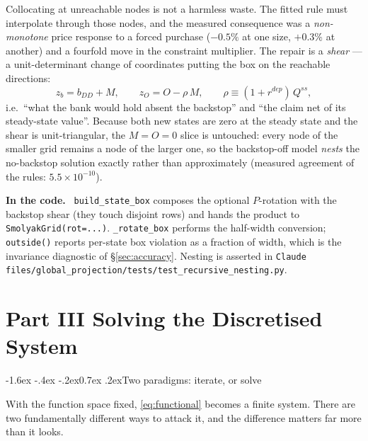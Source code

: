 \documentclass[10pt,a4paper]{article}
\makeatletter
\theoremstyle{definition}
\theoremstyle{plain}
\theoremstyle{remark}
\newenvironment{codehint}%
  {\par\vspace{2pt}\begin{framed}\noindent\small\textcolor{codeblue}{\textbf{In the code.}}\ }%
  {\end{framed}\vspace{2pt}}
\newcommand{\file}[1]{\textcolor{codeblue}{\texttt{#1}}}
\newcommand{\code}[1]{\texttt{#1}}
\renewcommand\section{\@startsection{section}{1}{\z@}%
  {-1.6ex \@plus -.4ex \@minus -.2ex}{0.7ex \@plus.2ex}{\normalfont\large\bfseries}}
\makeatother
\begin{document}
Collocating at unreachable nodes is not a harmless waste. The fitted rule must interpolate
through those nodes, and the measured consequence was a \emph{non-monotone} price response to
a forced purchase ($-0.5\%$ at one size, $+0.3\%$ at another) and a fourfold move in the
constraint multiplier. The repair is a \emph{shear} --- a unit-determinant change of
coordinates putting the box on the reachable directions:
\begin{equation}
  z_{b} = b_{DD} + M, \qquad z_{O} = O - \rho\,M, \qquad \rho \equiv (1+r^{dep})\,Q^{ss},
\end{equation}
i.e.\ ``what the bank would hold absent the backstop'' and ``the claim net of its
steady-state value''. Because both new states are zero at the steady state and the shear is
unit-triangular, the $M=O=0$ slice is untouched: every node of the smaller grid remains a node
of the larger one, so the backstop-off model \emph{nests} the no-backstop solution exactly
rather than approximately (measured agreement of the rules: $5.5\times10^{-10}$).

\begin{codehint}
\code{build\_state\_box} composes the optional $P$-rotation with the backstop shear (they
touch disjoint rows) and hands the product to \code{SmolyakGrid(rot=...)}.
\code{\_rotate\_box} performs the half-width conversion; \code{outside()} reports per-state
box violation as a fraction of width, which is the invariance diagnostic of
\S\ref{sec:accuracy}. Nesting is asserted in
\file{Claude files/global\_projection/tests/test\_recursive\_nesting.py}.
\end{codehint}

\vspace{-4pt}\part*{Part III \quad Solving the Discretised System}
\section{Two paradigms: iterate, or solve}
\label{sec:paradigms}

With the function space fixed, \eqref{eq:functional} becomes a finite system. There are two
fundamentally different ways to attack it, and the difference matters far more than it looks.
\end{document}
